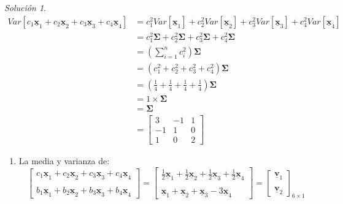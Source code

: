 \documentclass[
]{book}
\providecommand{\tightlist}{%
  \setlength{\itemsep}{0pt}\setlength{\parskip}{0pt}}
\theoremstyle{definition}
\theoremstyle{definition}
\theoremstyle{definition}
\theoremstyle{definition}
\theoremstyle{remark}
\newtheorem*{solution}{Solución}
\begin{document}
\begin{solution}
\begin{align*}
Var[c_1\underline{\mathbf{x}}_1+c_2\underline{\mathbf{x}}_2+
c_3\underline{\mathbf{x}}_3+
 c_4\underline{\mathbf{x}}_4]
&=c_1^2Var[\underline{\mathbf{x}}_1]+
c_2^2Var[\underline{\mathbf{x}}_2]+c_3^2Var[\underline{\mathbf{x}}_3]
+c_4^2Var[\underline{\mathbf{x}}_4]\\
&=c_1^2\mathbf{\Sigma}+c_2^2\mathbf{\Sigma}+c_3^2\mathbf{\Sigma}+
c_4^2\mathbf{\Sigma}\\
 &=\left( \sum_{i=1}^n c_i^2 \right)\mathbf{\Sigma}\\
&=(c_1^2+c_2^2+c_3^2+c_4^2)\mathbf{\Sigma}\\
&=\left(\frac{1}{4}+\frac{1}{4}+\frac{1}{4}+\frac{1}{4}\right)\mathbf{\Sigma}\\
&=1 \times \mathbf{\Sigma}\\ 
&=\mathbf{\Sigma}\\
&=\begin{bmatrix}
3 & -1 & 1\\ -1 & 1 &0 \\ 1 & 0& 2
\end{bmatrix}
\end{align*}

\begin{enumerate}
\def\labelenumi{\arabic{enumi}.}
\setcounter{enumi}{2}
\tightlist
\item
  La media y varianza de:
  \[
  \begin{bmatrix}
  c_1\underline{\mathbf{x}}_1+c_2\underline{\mathbf{x}}_2+
  c_3\underline{\mathbf{x}}_3+
  c_4\underline{\mathbf{x}}_4\\ \\  b_1\underline{\mathbf{x}}_1+b_2\underline{\mathbf{x}}_2+
  b_3\underline{\mathbf{x}}_3+b_4\underline{\mathbf{x}}_4
  \end{bmatrix}=\begin{bmatrix}
  \frac{1}{2}\underline{\mathbf{x}}_1+
  \frac{1}{2}\underline{\mathbf{x}}_2+\frac{1}{2}\underline{\mathbf{x}}_3+\frac{1}{2}\underline{\mathbf{x}}_4 \\ \\
  \underline{\mathbf{x}}_1+\underline{\mathbf{x}}_2+
  \underline{\mathbf{x}}_3-3\underline{\mathbf{x}}_4
  \end{bmatrix}=\begin{bmatrix}
  \underline{\mathbf{v}}_1 \\ \\ \underline{\mathbf{v}}_2
  \end{bmatrix}_{6 \times 1}
  \]
\end{enumerate}


\end{solution}
\end{document}
